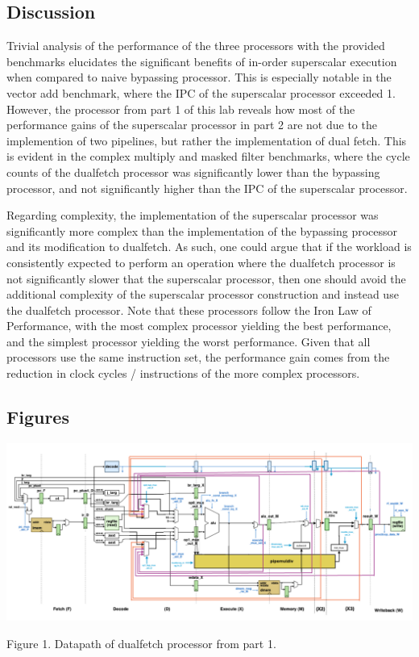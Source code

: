 \documentclass[11pt]{article}
\begin{document}
\subsection*{Discussion}



Trivial analysis of the performance of the three processors with the provided benchmarks elucidates
the significant benefits of in-order superscalar execution when compared to naive bypassing processor.
This is especially notable in the vector add benchmark, where the IPC of the superscalar processor exceeded 1.
However, the processor from part 1 of this lab reveals how most of the performance gains of the superscalar processor
in part 2 are not due to the implemention of two pipelines, but rather the implementation of dual fetch. 
This is evident in the complex multiply and masked filter benchmarks, where the cycle counts of the dualfetch
processor was significantly lower than the bypassing processor, and not significantly higher than the IPC
of the superscalar processor.

Regarding complexity, the implementation of the superscalar processor was significantly more complex than the
implementation of the bypassing processor and its modification to dualfetch. As such, one could argue that if
the workload is consistently expected to perform an operation where the dualfetch processor is not significantly slower that the 
superscalar processor, then one should avoid the additional complexity of the
superscalar processor construction and instead use the dualfetch processor. Note that these processors follow the Iron Law of 
Performance, with the most complex processor yielding the best performance, and the simplest processor yielding the worst performance.
Given that all processors use the same instruction set, the performance gain comes from the reduction in clock cycles / instructions of the 
more complex processors. 

\subsection*{Figures}

\begin{center}
\includegraphics[scale=0.32]{./dualfetch-datapath.png}
\end{center}
Figure 1. Datapath of dualfetch processor from part 1.
\end{document}
